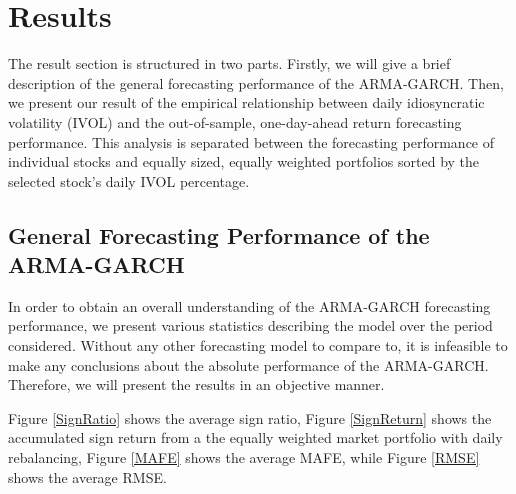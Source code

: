 \chapter{Results}
\label{Results}
The result section is structured in two parts. Firstly, we will give a brief description of the general forecasting performance of the ARMA-GARCH. Then, we present our result of the empirical relationship between daily idiosyncratic volatility (IVOL) and the out-of-sample, one-day-ahead return forecasting performance. This analysis is separated between the forecasting performance of individual stocks and equally sized, equally weighted portfolios sorted by the selected stock's daily IVOL percentage.

\section{General Forecasting Performance of the ARMA-GARCH}
In order to obtain an overall understanding of the ARMA-GARCH forecasting performance, we present various statistics describing the model over the period considered. Without any other forecasting model to compare to, it is infeasible to make any conclusions about the absolute performance of the ARMA-GARCH. Therefore, we will present the results in an objective manner.

Figure \ref{SignRatio} shows the average sign ratio, Figure \ref{SignReturn} shows the accumulated sign return from a the equally weighted market portfolio with daily rebalancing, Figure \ref{MAFE} shows the average MAFE, while Figure \ref{RMSE} shows the average RMSE.

